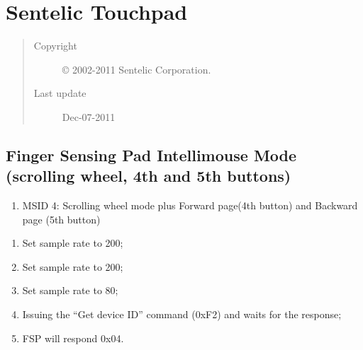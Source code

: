 \documentclass[a4paper,8pt,english]{sphinxmanual}
\begin{document}
\section{Sentelic Touchpad}
\label{input/devices/sentelic::doc}\label{input/devices/sentelic:sentelic-touchpad}\begin{quote}\begin{description}
\item[{Copyright}] \leavevmode
© 2002-2011 Sentelic Corporation.

\item[{Last update}] \leavevmode
Dec-07-2011

\end{description}\end{quote}


\subsection{Finger Sensing Pad Intellimouse Mode (scrolling wheel, 4th and 5th buttons)}
\label{input/devices/sentelic:finger-sensing-pad-intellimouse-mode-scrolling-wheel-4th-and-5th-buttons}\begin{enumerate}
\item {} 
MSID 4: Scrolling wheel mode plus Forward page(4th button) and Backward
page (5th button)

\end{enumerate}
\begin{enumerate}
\item {} 
Set sample rate to 200;

\item {} 
Set sample rate to 200;

\item {} 
Set sample rate to 80;

\item {} 
Issuing the ``Get device ID'' command (0xF2) and waits for the response;

\item {} 
FSP will respond 0x04.

\end{enumerate}
\end{document}
